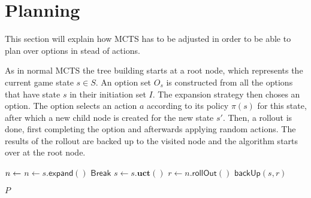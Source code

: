 \section{Planning}
\label{sec:planning}
This section will explain how MCTS has to be adjusted in order to be able to
plan over options in stead of actions. 

As in normal MCTS the tree building starts at a root node, which represents the
current game state $s \in S$. An option set $O_s$ is constructed from all the
options that have state $s$ in their initiation set $I$. The expansion
strategy then choses an option. The option selects an action $a$ according to its
policy $\pi(s)$ for this state, after which a new child node is created for the
new state $s'$. Then, a rollout is done, first completing the option and
afterwards applying random actions. The results of the rollout are backed up to
the visited node and the algorithm starts over at the root node.

		\begin{algorithm}[H]
			\caption{$\mathsf{O-MCTS}(s, t, mt)$}
			\label{alg:omcts}
			\begin{algorithmic}[1]

			 \label{alg:qpls:mainloop}
				\State $n \gets \relax $ %
						\State $n \gets s.\mathsf{expand}()$
						\State $\mathsf{Break}$
					\Else
						\State $s \gets s.\mathbf{uct}()$
					\EndIf
				\EndWhile
				\State $r \gets n.\mathsf{rollOut}()$
				\State $\mathsf{backUp}(s, r)$



			\EndWhile \label{alg:qpls:mainloopend}
			\State \Return $P$
			\end{algorithmic}
		\end{algorithm}

